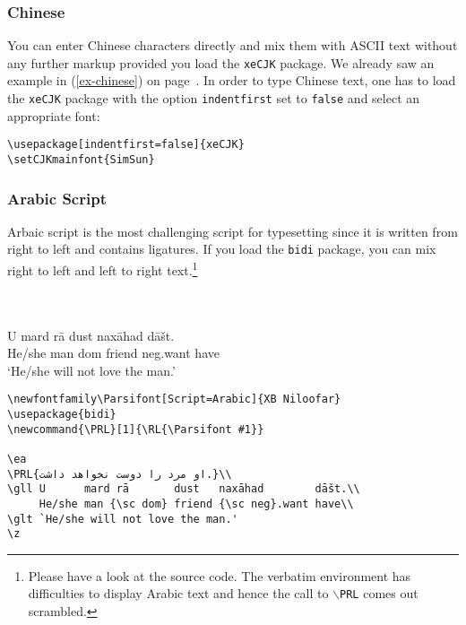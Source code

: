 \subsubsection{Chinese}
\label{sec-Chinese}

You can enter Chinese characters directly and mix them with ASCII text without any further markup
provided you load the \texttt{xeCJK} package. We already saw an example in (\ref{ex-chinese}) on
page~\pageref{ex-chinese}. In order to type Chinese text, one has to load the \texttt{xeCJK} package
with the option \verb+indentfirst+ set to \verb+false+ and select an appropriate font:
\begin{verbatim}
\usepackage[indentfirst=false]{xeCJK}
\setCJKmainfont{SimSun}
\end{verbatim}


\subsubsection{Arabic Script}

Arbaic script is the most challenging script for typesetting since it is written from right to left
and contains ligatures. If you load the \texttt{bidi} package, you can mix right to left and left to
right text.\footnote{
  Please have a look at the source code. The verbatim environment has difficulties to display Arabic
  text and hence the call to \texttt{$\backslash$PRL} comes out scrambled.
}

\ea
{}\\

\\
 \gll U      mard rā        dust   naxāhad        dāšt.\\
      He/she man  {\sc dom} friend {\sc neg}.want have\\
\glt `He/she will not love the man.'
\z

\begin{verbatim}
\newfontfamily\Parsifont[Script=Arabic]{XB Niloofar}
\usepackage{bidi}
\newcommand{\PRL}[1]{\RL{\Parsifont #1}}

\ea
\PRL{او مرد را دوست نخواهد داشت.}\\
\gll U      mard rā       dust   naxāhad        dāšt.\\
     He/she man {\sc dom} friend {\sc neg}.want have\\
\glt `He/she will not love the man.'
\z
\end{verbatim}

